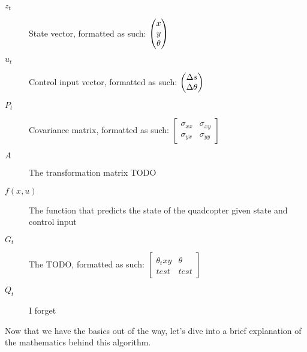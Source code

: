 \documentclass[12pt]{article}
\newcommand*\colvec[3][]{
	\begin{pmatrix}\ifx\relax#1\relax\else#1\\\fi#2\\#3\end{pmatrix}
}
\begin{document}
\begin{description}
	\item[$z_t$] {State vector, formatted as such: $\colvec[x]{y}{\theta}$}
	\item[$u_t$] {Control input vector, formatted as such: $\colvec{\Delta s}{\Delta \theta}$}
	\item[$P_t$] {Covariance matrix, formatted as such: $\begin{bmatrix}\sigma_{xx} & \sigma_{xy}\\\sigma_{yx} & \sigma_{yy}\end{bmatrix}$}
	\item[$A$]   {The transformation matrix TODO}
	\item[$f(x, u)$] {The function that predicts the state of the quadcopter given state and control input}
	\item[$G_t$] {The TODO, formatted as such: $\begin{bmatrix}\theta_t{xy} & \theta\\test & test\end{bmatrix}$}
	\item[$Q_t$] {I forget}
\end{description}

Now that we have the basics out of the way, let's dive into a brief explanation of the mathematics behind this algorithm.
\end{document}
